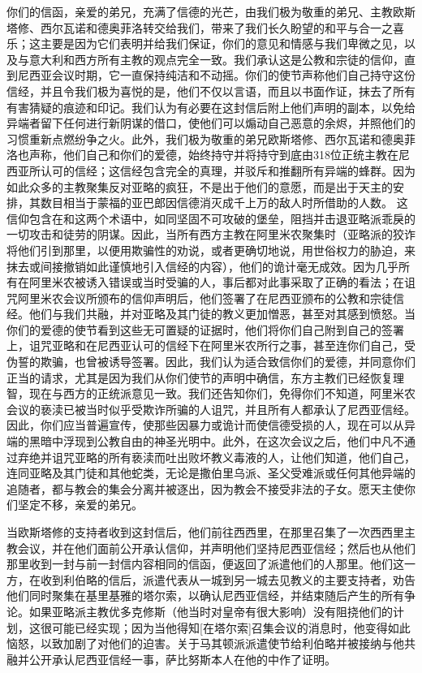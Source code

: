 你们的信函，亲爱的弟兄，充满了信德的光芒，由我们极为敬重的弟兄、主教欧斯塔修、西尔瓦诺和德奥菲洛转交给我们，带来了我们长久盼望的和平与合一之喜乐；这主要是因为它们表明并给我们保证，你们的意见和情感与我们卑微之见，以及与意大利和西方所有主教的观点完全一致。我们承认这是公教和宗徒的信仰，直到尼西亚会议时期，它一直保持纯洁和不动摇。你们的使节声称他们自己持守这份信经，并且令我们极为喜悦的是，他们不仅以言语，而且以书面作证，抹去了所有有害猜疑的痕迹和印记。我们认为有必要在这封信后附上他们声明的副本，以免给异端者留下任何进行新阴谋的借口，使他们可以煽动自己恶意的余烬，并照他们的习惯重新点燃纷争之火。此外，我们极为敬重的弟兄欧斯塔修、西尔瓦诺和德奥菲洛也声称，他们自己和你们的爱德，始终持守并将持守到底由318位正统主教在尼西亚所认可的信经；这信经包含完全的真理，并驳斥和推翻所有异端的蜂群。因为如此众多的主教聚集反对亚略的疯狂，不是出于他们的意愿，而是出于天主的安排，其数目相当于蒙福的亚巴郎因信德消灭成千上万的敌人时所借助的人数。 这信仰包含在和这两个术语中，如同坚固不可攻破的堡垒，阻挡并击退亚略派乖戾的一切攻击和徒劳的阴谋。因此，当所有西方主教在阿里米农聚集时（亚略派的狡诈将他们引到那里，以便用欺骗性的劝说，或者更确切地说，用世俗权力的胁迫，来抹去或间接撤销如此谨慎地引入信经的内容），他们的诡计毫无成效。因为几乎所有在阿里米农被诱入错误或当时受骗的人，事后都对此事采取了正确的看法；在诅咒阿里米农会议所颁布的信仰声明后，他们签署了在尼西亚颁布的公教和宗徒信经。他们与我们共融，并对亚略及其门徒的教义更加憎恶，甚至对其感到愤怒。当你们的爱德的使节看到这些无可置疑的证据时，他们将你们自己附到自己的签署上，诅咒亚略和在尼西亚认可的信经下在阿里米农所行之事，甚至连你们自己，受伪誓的欺骗，也曾被诱导签署。因此，我们认为适合致信你们的爱德，并同意你们正当的请求，尤其是因为我们从你们使节的声明中确信，东方主教们已经恢复理智，现在与西方的正统派意见一致。我们还告知你们，免得你们不知道，阿里米农会议的亵渎已被当时似乎受欺诈所骗的人诅咒，并且所有人都承认了尼西亚信经。因此，你们应当普遍宣传，使那些因暴力或诡计而使信德受损的人，现在可以从异端的黑暗中浮现到公教自由的神圣光明中。此外，在这次会议之后，他们中凡不通过弃绝并诅咒亚略的所有亵渎而吐出败坏教义毒液的人，让他们知道，他们自己，连同亚略及其门徒和其他蛇类，无论是撒伯里乌派、圣父受难派或任何其他异端的追随者，都与教会的集会分离并被逐出，因为教会不接受非法的子女。愿天主使你们坚定不移，亲爱的弟兄。\par

当欧斯塔修的支持者收到这封信后，他们前往西西里，在那里召集了一次西西里主教会议，并在他们面前公开承认信仰，并声明他们坚持尼西亚信经；然后也从他们那里收到一封与前一封信内容相同的信函，便返回了派遣他们的人那里。他们这一方，在收到利伯略的信后，派遣代表从一城到另一城去见教义的主要支持者，劝告他们同时聚集在基里基雅的塔尔索，以确认尼西亚信经，并结束随后产生的所有争论。如果亚略派主教优多克修斯（他当时对皇帝有很大影响）没有阻挠他们的计划，这很可能已经实现；因为当他得知[在塔尔索]召集会议的消息时，他变得如此恼怒，以致加剧了对他们的迫害。关于马其顿派派遣使节给利伯略并被接纳与他共融并公开承认尼西亚信经一事，萨比努斯本人在他的中作了证明。\par

